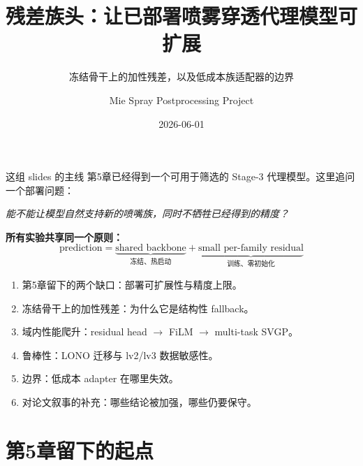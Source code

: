 \documentclass[UTF8,aspectratio=169]{ctexbeamer}
\title[残差族头]{残差族头：让已部署喷雾穿透代理模型可扩展}
\subtitle{冻结骨干上的加性残差，以及低成本族适配器的边界}
\author{Mie Spray Postprocessing Project}
\date{2026-06-01}
\begin{document}
\begin{frame}
  \titlepage
\end{frame}

\begin{frame}{这组 slides 的主线}
\small
第5章已经得到一个可用于筛选的 Stage-3 代理模型。这里追问一个部署问题：
\begin{center}
\emph{能不能让模型自然支持新的喷嘴族，同时不牺牲已经得到的精度？}
\end{center}

\vspace{0.35em}
\textbf{所有实验共享同一个原则：}
\[
  \boxed{\ \text{prediction}=\underbrace{\text{shared backbone}}_{\text{冻结、热启动}}
  +\underbrace{\text{small per-family residual}}_{\text{训练、零初始化}}\ }
\]

\vspace{0.35em}
\begin{enumerate}\setlength\itemsep{2pt}
  \item 第5章留下的两个缺口：部署可扩展性与精度上限。
  \item 冻结骨干上的加性残差：为什么它是结构性 fallback。
  \item 域内性能爬升：residual head $\to$ FiLM $\to$ multi-task SVGP。
  \item 鲁棒性：LONO 迁移与 lv2/lv3 数据敏感性。
  \item 边界：低成本 adapter 在哪里失效。
  \item 对论文叙事的补充：哪些结论被加强，哪些仍要保守。
\end{enumerate}
\end{frame}

\section{第5章留下的起点}
\end{document}
